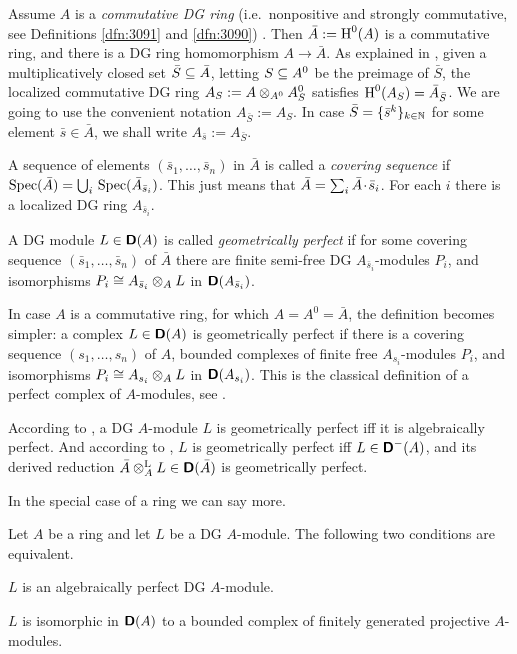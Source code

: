 \begin{rem} \label{rem:3425}
Assume $A$ is a {\em commutative DG ring} (i.e.\ nonpositive and strongly 
commutative, see Definitions \ref{dfn:3091} and \ref{dfn:3090})  .
Then $\bar{A} := \operatorname{H}^0(A)$ is a commutative ring, and there is a DG ring 
homomorphism $A \to \bar{A}$. 
As explained in \cite{Ye10}, 
given a multiplicatively closed set $\bar{S} \subseteq \bar{A}$, letting 
$S \subseteq A^0$ be the preimage of $\bar{S}$, the localized commutative DG ring 
$A_S := A \otimes_{A^0} A^0_S$ satisfies 
$\operatorname{H}^0(A_S) = \bar{A}_{\bar{S}}$. 
We are going to use the convenient notation $A_{\bar{S}} := A_S$.
In case $\bar{S} = \{ \bar{s}^k \}_{k \in \mathbb{N}}$
for  some element $\bar{s} \in \bar{A}$, we shall write 
$A_{\bar{s}} := A_{\bar{S}}$.

A sequence of elements $(\bar{s}_1, \ldots, \bar{s}_n)$ in $\bar{A}$ is called 
a {\em covering sequence} if 
$\operatorname{Spec}(\bar{A}) = \bigcup_{i} \, \operatorname{Spec}(\bar{A}_{\bar{s}_i})$.
This just means that 
$\bar{A} = \sum_{i} \bar{A} \mspace{1.5mu}{\cdot}\mspace{1.5mu} \bar{s}_i$. 
For each $i$ there is a localized DG ring $A_{\bar{s}_i}$. 

A DG module $L \in \boldsymbol{\mathsf{D}}(A)$ is called {\em geometrically perfect} 
if for some covering sequence $(\bar{s}_1, \ldots, \bar{s}_n)$ of $\bar{A}$
there are finite semi-free DG $A_{\bar{s}_i}$-modules $P_i$, and isomorphisms 
$P_i \cong A_{\bar{s}_i} \otimes_A L$ in $\boldsymbol{\mathsf{D}}(A_{\bar{s}_i})$. 

In case $A$ is a commutative ring, for which $A = A^0 = \bar{A}$, the 
definition becomes simpler: a complex $L \in \boldsymbol{\mathsf{D}}(A)$ is geometrically 
perfect if there is a covering sequence $(s_1, \ldots, s_n)$ of 
$A$, bounded complexes of finite free $A_{s_i}$-modules $P_i$,
and isomorphisms $P_i \cong A_{s_i} \otimes_A L$ in $\boldsymbol{\mathsf{D}}(A_{s_i})$. 
This is the classical definition of a perfect complex of $A$-modules, see 
\cite{SGA6}. 

According to \cite[Corollary 5.21]{Ye10}, a DG $A$-module $L$ is geometrically 
perfect iff it is algebraically perfect. And according to 
\cite[Theorem 5.11]{Ye10}, $L$ is geometrically perfect iff 
$L \in \boldsymbol{\mathsf{D}}^-(A)$, and its derived reduction 
$\bar{A} \otimes^{\mathrm{L}}_{A} L \in \boldsymbol{\mathsf{D}}(\bar{A})$ is geometrically perfect.
\end{rem}

In the special case of a ring we can say more. 

\begin{thm} \label{thm:3415}
Let $A$ be a ring and let $L$ be a DG $A$-module. The following two conditions 
are equivalent.
\begin{itemize}
  $L$ is an algebraically perfect DG $A$-module. 

 $L$ is isomorphic in $\boldsymbol{\mathsf{D}}(A)$ to a bounded complex of 
finitely generated projective $A$-modules.
\end{itemize}
\end{thm}

